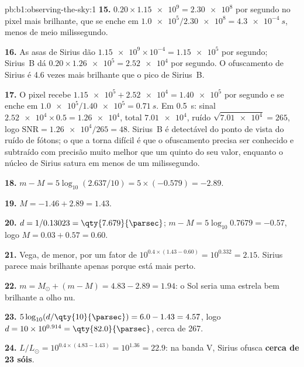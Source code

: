 \begin{solution}{pb:b1:observing-the-sky:1}
\textbf{15.} $0.20\times\num{1.15e9} = \num{2.30e8}$ por segundo no
pixel mais brilhante, que se enche em $\num{1.0e5}/\num{2.30e8} =
\qty{4.3e-4}{s}$, menos de meio milissegundo.

\textbf{16.} As asas de Sirius dão $\num{1.15e9}\times10^{-4} =
\num{1.15e5}$ por segundo; Sirius~B dá $0.20\times\num{1.26e5} =
\num{2.52e4}$ por segundo. O ofuscamento de Sirius é 4.6 vezes mais brilhante que
o pico de Sirius~B.

\textbf{17.} O pixel recebe $\num{1.15e5} + \num{2.52e4} = \num{1.40e5}$
por segundo e se enche em $\num{1.0e5}/\num{1.40e5} = \qty{0.71}{s}$. Em
\qty{0.5}{s}: sinal $\num{2.52e4}\times0.5 = \num{1.26e4}$, total
$\num{7.01e4}$, ruído $\sqrt{\num{7.01e4}} = 265$, logo $\mathrm{SNR} =
\num{1.26e4}/265 = 48$. Sirius~B é detectável do ponto de vista do ruído de
fótons; o que a torna difícil é que o ofuscamento precisa ser conhecido e
subtraído com precisão muito melhor que um quinto do seu valor, enquanto o núcleo
de Sirius satura em menos de um milissegundo.

\textbf{18.} $m - M = 5\log_{10}(2.637/10) = 5\times(-0.579) = -2.89$.

\textbf{19.} $M = -1.46 + 2.89 = 1.43$.

\textbf{20.} $d = 1/0.13023 = \qty{7.679}{\parsec}$;
$m - M = 5\log_{10}0.7679 = -0.57$, logo $M = 0.03 + 0.57 = 0.60$.

\textbf{21.} Vega, de  menor, por um fator de
$10^{0.4\times(1.43 - 0.60)} = 10^{0.332} = 2.15$. Sirius parece mais brilhante
apenas porque está mais perto.

\textbf{22.} $m = M_\odot + (m - M) = 4.83 - 2.89 = 1.94$: o Sol seria
uma estrela bem brilhante a olho nu.

\textbf{23.} $5\log_{10}(d/\qty{10}{\parsec}) = 6.0 - 1.43 = 4.57$, logo
$d = 10\times10^{0.914} = \qty{82.0}{\parsec}$, cerca de \qty{267}{\lightyear}.

\textbf{24.} $L/L_\odot = 10^{0.4\times(4.83 - 1.43)} = 10^{1.36} = 22.9$:
na banda V, Sirius ofusca \textbf{cerca de 23 sóis}.
\end{solution}
